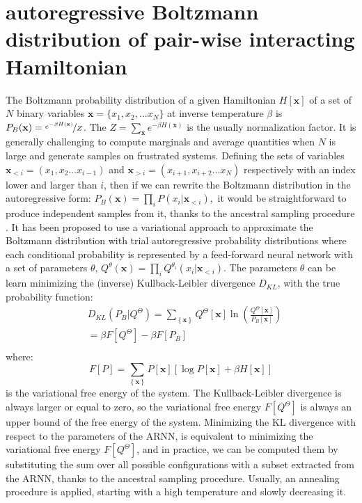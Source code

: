 \documentclass[aps,physrev,10pt,floatfix,reprint]{revtex4-2}
\begin{document}
\section{autoregressive Boltzmann distribution of pair-wise interacting Hamiltonian}
\label{sec:ARNN_boltzmann}
The Boltzmann probability distribution of a given Hamiltonian $H[\mathbf{x}]$ of a set of $N$ binary variables $\mathbf{x}=\{x_1, x_2,...x_N\}$ at inverse temperature $\beta$ is $P_{B}(\mathbf{x}) = \nicefrac{e^{-\beta H\left(\mathbf{x}\right)}}{Z}$. The $Z=\sum_{\mathbf{x}}e^{-\beta H\left(\mathbf{x}\right)}$ is the usually normalization factor.
It is generally challenging to compute marginals and average quantities when $N$ is large and generate samples on frustrated systems. Defining the sets of variables $\mathbf{x}_{<i}=\left(x_{1},x_{2}\dots x_{i-1}\right)$ and $\mathbf{x}_{>i}=\left(x_{i+1},x_{i+2}\dots x_{N}\right)$ respectively with an index lower and larger than $i$, then if we can rewrite the Boltzmann distribution in the autoregressive form:
$
P_{B}\left(\mathbf{x}\right)=\prod_{i}P\left(x_{i}|\mathbf{x}_{<i}\right),
$
it would be straightforward to produce independent samples from it, thanks to the ancestral sampling procedure \cite{Wu2019}. It has been proposed \cite{Wu2019} to use a variational approach to approximate the Boltzmann distribution with trial autoregressive probability distributions where each conditional probability is represented by a feed-forward neural network with a set of parameters ${\theta}$,
$
Q^{\theta}\left(\mathbf{x}\right)=\prod_{i}Q^{\theta_i}\left(x_{i}|\mathbf{x}_{<i}\right)
$.
The parameters ${\theta}$ can be learn minimizing the (inverse) Kullback-Leibler divergence $D_{KL}$,
with the true probability function:
\begin{equation}
\begin{split}
& D_{KL}\left(P_{B}|Q^{\Theta}\right) =  \sum_{\left\{ \mathbf{x} \right\} } Q^{\Theta} [\mathbf{x}]\ln\left(\frac{Q^{\Theta}[\mathbf{x}]}{P_{B}[\mathbf{x}]}\right)  \\
& = \beta F[Q^{\Theta}] - \beta F[P_{B}]\\
\end{split}
\label{eq:kl}    
\end{equation}
where:
$$F[P]= \sum_{\left\{ \mathbf{x} \right\}}P[\mathbf{x}]\left[\log P[\mathbf{x}] + \beta H[\mathbf{x}] \right] 
$$
is the variational free energy of the system. The Kullback-Leibler divergence is always larger or equal to zero, so the variational free energy $F[Q^{\Theta}]$ is always an upper bound of the free energy of the system. Minimizing the KL divergence with respect to the parameters of the ARNN, is equivalent to minimizing the variational free energy $F[Q^{\Theta}]$, and in practice, we can be computed them by substituting the sum over all possible configurations with a subset extracted from the ARNN, thanks to the ancestral sampling procedure\cite{Wu2019}. Usually, an annealing procedure is applied, starting with a high temperature and slowly decreasing it.
\end{document}
